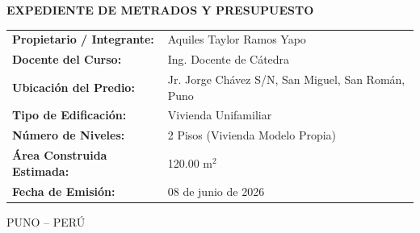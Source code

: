 \begin{titlepage}
\begin{minipage}{5.20in}
\vspace{0.40in}
{\fontsize{13}{16}\selectfont\bfseries EXPEDIENTE DE METRADOS Y PRESUPUESTO\par}

\vspace{0.40in}
\begin{flushleft}
\fontsize{10}{13}\selectfont
\renewcommand{\arraystretch}{1.2}
\begin{tabular}{>{\bfseries}p{1.8in}l}
Propietario / Integrante: & Aquiles Taylor Ramos Yapo \\
Docente del Curso: & Ing. Docente de Cátedra \\
Ubicación del Predio: & Jr. Jorge Chávez S/N, San Miguel, San Román, Puno \\
Tipo de Edificación: & Vivienda Unifamiliar \\
Número de Niveles: & 2 Pisos (Vivienda Modelo Propia) \\
Área Construida Estimada: & 120.00 m\(^2\) \\
Fecha de Emisión: & 08 de junio de 2026 \\
\end{tabular}
\end{flushleft}

\vfill
{\fontsize{10}{12}\selectfont PUNO -- PERÚ\par}
{\fontsize{9}{11}\par}
\end{minipage}

\end{titlepage}
